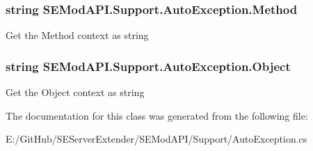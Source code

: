 \subsubsection[{Method}]{\setlength{\rightskip}{0pt plus 5cm}string S\+E\+Mod\+A\+P\+I.\+Support.\+Auto\+Exception.\+Method\hspace{0.3cm}{\ttfamily [get]}}\label{class_s_e_mod_a_p_i_1_1_support_1_1_auto_exception_aecf1db9ecc69bc498a8e606fde1185d8}


Get the Method context as string 

\hypertarget{class_s_e_mod_a_p_i_1_1_support_1_1_auto_exception_a0583b17fad60a355f23cffa1885e5d7e}{}
\subsubsection[{Object}]{\setlength{\rightskip}{0pt plus 5cm}string S\+E\+Mod\+A\+P\+I.\+Support.\+Auto\+Exception.\+Object\hspace{0.3cm}{\ttfamily [get]}}\label{class_s_e_mod_a_p_i_1_1_support_1_1_auto_exception_a0583b17fad60a355f23cffa1885e5d7e}


Get the Object context as string 



The documentation for this class was generated from the following file\+:\begin{DoxyCompactItemize}
\item 
E\+:/\+Git\+Hub/\+S\+E\+Server\+Extender/\+S\+E\+Mod\+A\+P\+I/\+Support/Auto\+Exception.\+cs\end{DoxyCompactItemize}
